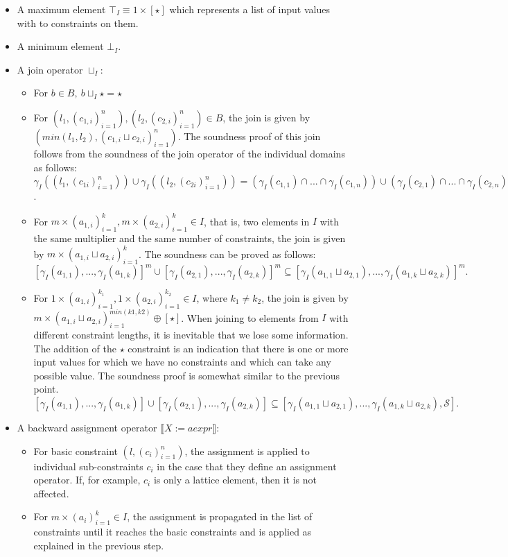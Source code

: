 \documentclass[10pt]{report}
\begin{document}
\begin{itemize}
	\item A maximum element $ \top_{I} \equiv 1 \times [\star] $ which represents a list of input values with to constraints on them.  
	\item A minimum element $ \bot_{I}. $
	\item A join operator $\sqcup_{I}$:
	\begin{itemize}
		\item For $ b \in B,\ b \sqcup_{I} \star = \star$
		\item For $(l_{1}, (c_{1,i})_{i=1}^{n}), (l_{2}, (c_{2,i})_{i=1}^{n}) \in B$, the join is given by $ (min(l_{1}, l_{2}), (c_{1,i} \sqcup c_{2,i})_{i=1}^{n}) $. The soundness proof of this join follows from the soundness of the join operator of the individual domains as follows: $ \gamma_{I}((l_{1}, (c_{1i})_{i=1}^{n})) \cup \gamma_{I}((l_{2}, (c_{2i})_{i=1}^{n})) = (\gamma_{I}(c_{1,1}) \cap ... \cap \gamma_{I}(c_{1, n})) \cup (\gamma_{I}(c_{2,1}) \cap ... \cap \gamma_{I}(c_{2, n})) \subseteq \gamma_{I}(c_{1, 1} \sqcup c_{2, 1}) \cap ... \cap \gamma_{I}(c_{1, n} \sqcup c_{2, n}) $. 
		\item For $ m \times (a_{1,i})_{i=1}^{k}, m \times (a_{2,i})_{i=1}^{k}  \in I$, that is, two elements in $ I $ with the same multiplier and the same number of constraints, the join is given by $ m \times (a_{1,i} \sqcup a_{2,i})_{i=1}^{k} $. The soundness can be proved as follows: $ [\gamma_{I}(a_{1,1}), ..., \gamma_{I}(a_{1,k})]^{m} \cup [\gamma_{I}(a_{2,1}), ..., \gamma_{I}(a_{2, k})]^{m} \subseteq [\gamma_{I}(a_{1,1} \sqcup a_{2, 1}), ..., \gamma_{I}(a_{1, k} \sqcup a_{2, k})]^{m}.$
		\item For $ 1 \times (a_{1, i})_{i=1}^{k_{1}}, 1 \times (a_{2, i})_{i=1}^{k_{2}} \in I $, where $ k_{1} \neq k_{2} $, the join is given by $ m \times (a_{1,i} \sqcup a_{2,i})_{i=1}^{min(k1, k2)} \oplus [\star]$. When joining to elements from $ I $ with different constraint lengths, it is inevitable that we lose some information. The addition of the $ \star $ constraint is an indication that there is one or more input values for which we have no constraints and which can take any possible value. The soundness proof is somewhat similar to the previous point. $ [\gamma_{I}(a_{1,1}), ..., \gamma_{I}(a_{1,k})] \cup [\gamma_{I}(a_{2,1}), ..., \gamma_{I}(a_{2, k})] \subseteq [\gamma_{I}(a_{1,1} \sqcup a_{2, 1}), ..., \gamma_{I}(a_{1, k} \sqcup a_{2, k}), \mathcal{S}].$
	\end{itemize}

	\item A backward assignment operator $ \llbracket X := aexpr \rrbracket $:
	\begin{itemize}
		\item For basic constraint $(l, (c_{i})_{i=1}^{n})$, the assignment is applied to individual sub-constraints $ c_{i} $ in the case that they define an assignment operator. If, for example, $ c_{i} $ is only a lattice element, then it is not affected. 
		\item For $ m \times (a_{i})_{i=1}^{k} \in I$, the assignment is propagated in the list of constraints until it reaches the basic constraints and is applied as explained in the previous step. 
	\end{itemize}
	

\end{itemize}
\end{document}
